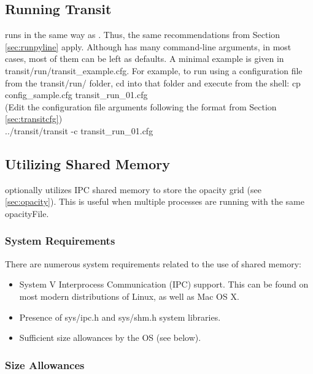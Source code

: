 \documentclass[letterpaper, 12pt]{article}
\begin{document}
\subsection{Running Transit}

{\transit} runs in the same way as {\pylineread}.  Thus, the same
recommendations from Section \ref{sec:runpyline} apply.  Although
{\transit} has many command-line arguments, in most cases, most of
them can be left as defaults.  A minimal example is given in {\tttm
  transit/run/transit\_example.cfg}. For example, to run {\transit}
using a configuration file from the {\tttm transit/run/} folder, cd
into that folder and execute from the shell:\newline
{\tttb cp config\_sample.cfg  transit\_run\_01.cfg} \\
(Edit the configuration file arguments following the format from
  Section \ref{sec:transitcfg}) \\
{\tttb ../transit/transit -c transit\_run\_01.cfg} \\

\subsection{Utilizing Shared Memory}
\label{sec:sharedmem}

{\transit} optionally utilizes IPC shared memory to store the opacity
grid (see \ref{sec:opacity}). This is useful when multiple {\transit}
processes are running with the same {\tttb opacityFile}.

\subsubsection{System Requirements}

There are numerous system requirements related to the use of shared
memory:

\begin{itemize}
\setlength\itemsep{0ex}
\setlength\topsep{0ex}
\setlength\partopsep{0ex}
\setlength\parsep{0ex}
\item System V Interprocess Communication (IPC) support. This can be
      found on most modern distributions of Linux, as well as Mac OS X.
\item Presence of {\tttm sys/ipc.h} and {\tttm sys/shm.h} system libraries.
\item Sufficient size allowances by the OS (see below).
\end{itemize}

\subsubsection{Size Allowances}
\end{document}
